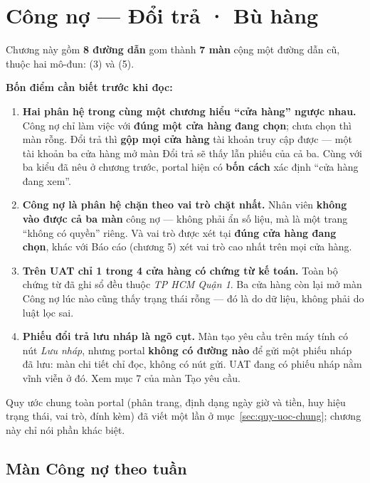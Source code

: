 \chapter{Công nợ --- Đổi trả · Bù hàng}

Chương này gồm \textbf{8 đường dẫn} gom thành \textbf{7 màn} cộng một đường dẫn cũ, thuộc hai
mô-đun:  (3) và  (5).

\textbf{Bốn điểm cần biết trước khi đọc:}

\begin{enumerate}[leftmargin=*]
  \item \textbf{Hai phân hệ trong cùng một chương hiểu ``cửa hàng'' ngược nhau.} Công nợ chỉ
        làm việc với \textbf{đúng một cửa hàng đang chọn}; chưa chọn thì màn rỗng. Đổi trả thì
        \textbf{gộp mọi cửa hàng} tài khoản truy cập được --- một tài khoản ba cửa hàng mở màn
        Đổi trả sẽ thấy lẫn phiếu của cả ba. Cùng với ba kiểu đã nêu ở chương trước, portal
        hiện có \textbf{bốn cách} xác định ``cửa hàng đang xem''.
  \item \textbf{Công nợ là phân hệ chặn theo vai trò chặt nhất.} Nhân viên \textbf{không vào
        được cả ba màn} công nợ --- không phải ẩn số liệu, mà là một trang ``không có quyền''
        riêng. Và vai trò được xét tại \textbf{đúng cửa hàng đang chọn}, khác với Báo cáo
        (chương 5) xét vai trò cao nhất trên mọi cửa hàng.
  \item \textbf{Trên UAT chỉ 1 trong 4 cửa hàng có chứng từ kế toán.} Toàn bộ  chứng từ
        đã ghi sổ đều thuộc \emph{TP HCM Quận 1}. Ba cửa hàng còn lại mở màn Công nợ lúc nào
        cũng thấy trạng thái rỗng --- đó là do dữ liệu, không phải do luật lọc sai.
  \item \textbf{Phiếu đổi trả lưu nháp là ngõ cụt.} Màn tạo yêu cầu trên máy tính có nút
        \emph{Lưu nháp}, nhưng portal \textbf{không có đường nào} để gửi một phiếu nháp đã lưu:
        màn chi tiết chỉ đọc, không có nút gửi. UAT đang có  phiếu nháp nằm vĩnh viễn ở
        đó. Xem mục 7 của màn Tạo yêu cầu.
\end{enumerate}

Quy ước chung toàn portal (phân trang, định dạng ngày giờ và tiền, huy hiệu trạng thái, vai
trò, đính kèm) đã viết một lần ở mục~\ref{sec:quy-uoc-chung}; chương này chỉ nói phần khác
biệt.

\section{Màn Công nợ theo tuần}
\medskip

